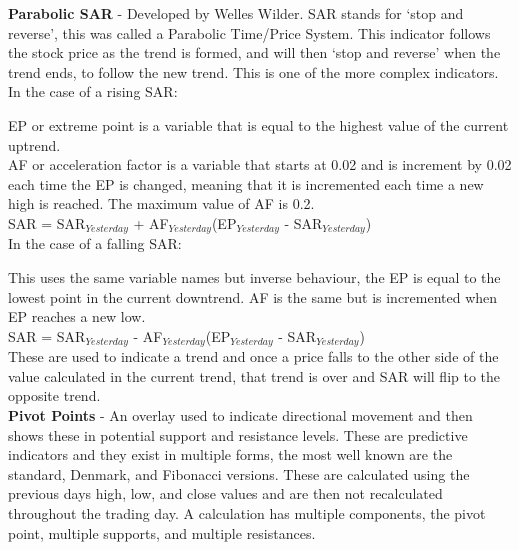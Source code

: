 \documentclass[12pt,a4paper]{article}
\begin{document}
\iffalse
[]
\fi

\noindent
\textbf{Parabolic SAR} - Developed by Welles Wilder. SAR stands for `stop and reverse', this was called a Parabolic Time/Price System. This indicator follows the stock price as the trend is formed, and will then `stop and reverse' when the trend ends, to follow the new trend. This is one of the more complex indicators.\\

\noindent
In the case of a rising SAR:

\noindent
EP or extreme point is a variable that is equal to the highest value of the current uptrend.\\
AF or acceleration factor is a variable that starts at 0.02 and is increment by 0.02 each time the EP is changed, meaning that it is incremented each time a new high is reached. The maximum value of AF is 0.2. \\

\noindent
SAR = SAR$_{Yesterday}$ + AF$_{Yesterday}$(EP$_{Yesterday}$ - SAR$_{Yesterday}$) \\

\noindent
In the case of a falling SAR:

\noindent
This uses the same variable names but inverse behaviour, the EP is equal to the lowest point in the current downtrend. AF is the same but is incremented when EP reaches a new low. \\

\noindent
SAR = SAR$_{Yesterday}$ - AF$_{Yesterday}$(EP$_{Yesterday}$ - SAR$_{Yesterday}$) \\

\noindent
These are used to indicate a trend and once a price falls to the other side of the value calculated in the current trend, that trend is over and SAR will flip to the opposite trend. \\

\iffalse
[]
\fi

\noindent
\textbf{Pivot Points} - An overlay used to indicate directional movement and then shows these in potential support and resistance levels. These are predictive indicators and they exist in multiple forms, the most well known are the standard, Denmark, and Fibonacci versions. These are calculated using the previous days high, low, and close values and are then not recalculated throughout the trading day. A calculation has multiple components, the pivot point, multiple supports, and multiple resistances.\\
\end{document}
